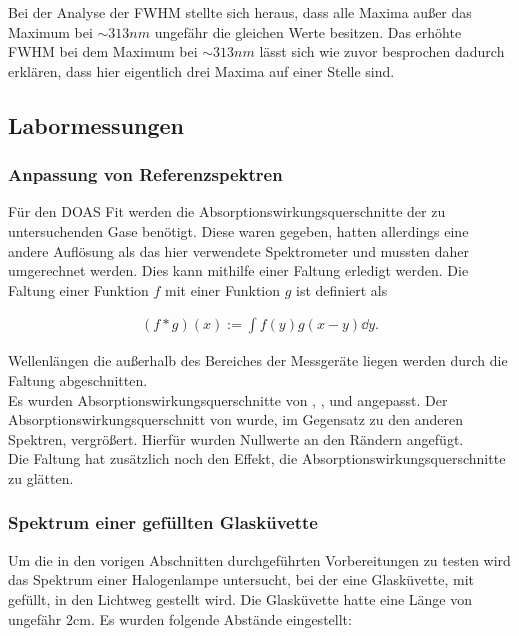 \documentclass[12pt, a4paper, bibliography=totoc]{scrartcl}
\begin{document}
\begin{multicols}{2}
Bei der Analyse der FWHM stellte sich heraus, dass alle Maxima außer das Maximum bei $\sim 313 \si{nm}$ ungefähr die gleichen Werte besitzen.
Das erhöhte FWHM bei dem Maximum bei $\sim 313 \si{nm}$ lässt sich wie zuvor besprochen dadurch erklären, dass hier eigentlich drei Maxima auf einer Stelle sind.

\subsection{Labormessungen}\label{ssec:Labormessungen}

\subsubsection{Anpassung von Referenzspektren}\label{sssec:convolution_of_reference}


Für den DOAS Fit werden die Absorptionswirkungsquerschnitte der zu untersuchenden Gase benötigt.
Diese waren gegeben, hatten allerdings eine andere Auflösung als das hier verwendete Spektrometer und mussten daher umgerechnet werden.
Dies kann mithilfe einer Faltung erledigt werden.
Die Faltung einer Funktion $f$ mit einer Funktion $g$ ist definiert als

\begin{align}
    (f \ast g) (x) := \int f(y) g(x-y) \dd y .
\end{align}

Wellenlängen die außerhalb des Bereiches der Messgeräte liegen werden durch die Faltung abgeschnitten.\\
Es wurden Absorptionswirkungsquerschnitte von  , ,  und  angepasst.
Der Absorptionswirkungsquerschnitt von  wurde, im Gegensatz zu den anderen Spektren, vergrößert. 
Hierfür wurden Nullwerte an den Rändern angefügt.\\
Die Faltung hat zusätzlich noch den Effekt, die Absorptionswirkungsquerschnitte zu glätten.

\subsubsection{ Spektrum einer gefüllten Glasküvette}\label{sssec:lab_no2_spectra}

Um die in den vorigen Abschnitten durchgeführten Vorbereitungen zu testen wird das Spektrum einer Halogenlampe untersucht, bei der eine Glasküvette, mit  gefüllt, in den Lichtweg gestellt wird.
Die Glasküvette hatte eine Länge von ungefähr $2$\si{cm}.
Es wurden folgende Abstände eingestellt:
\begin{center}


\end{center}
\end{multicols}
\end{document}
